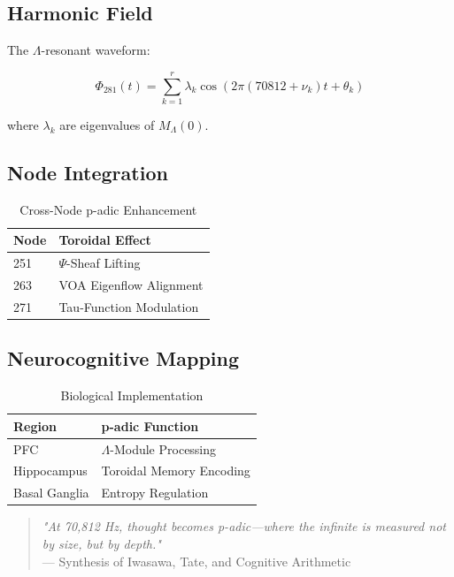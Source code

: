 \documentclass[12pt]{article}
\begin{document}
\subsection{Harmonic Field}
\label{subsec:audio}

The $\Lambda$-resonant waveform:

\[
\Phi_{281}(t) = \sum_{k=1}^r \lambda_k \cos(2\pi(70812 + \nu_k)t + \theta_k)
\]

where $\lambda_k$ are eigenvalues of $M_\Lambda(0)$.

\subsection{Node Integration}
\label{subsec:integration}

\begin{table}[h]
\centering
\caption{Cross-Node p-adic Enhancement}
\begin{tabular}{ll}
\hline
\textbf{Node} & \textbf{Toroidal Effect} \\
\hline
251 & $\Psi$-Sheaf Lifting \\
263 & VOA Eigenflow Alignment \\
271 & Tau-Function Modulation \\
\hline
\end{tabular}
\end{table}

\subsection{Neurocognitive Mapping}
\label{subsec:neuro}

\begin{table}[h]
\centering
\caption{Biological Implementation}
\begin{tabular}{ll}
\hline
\textbf{Region} & \textbf{p-adic Function} \\
\hline
PFC & $\Lambda$-Module Processing \\
Hippocampus & Toroidal Memory Encoding \\
Basal Ganglia & Entropy Regulation \\
\hline
\end{tabular}
\end{table}

\begin{quote}
\textit{"At 70,812 Hz, thought becomes p-adic—where the infinite is measured not by size, but by depth."} \\
— Synthesis of Iwasawa, Tate, and Cognitive Arithmetic
\end{quote}
\end{document}
